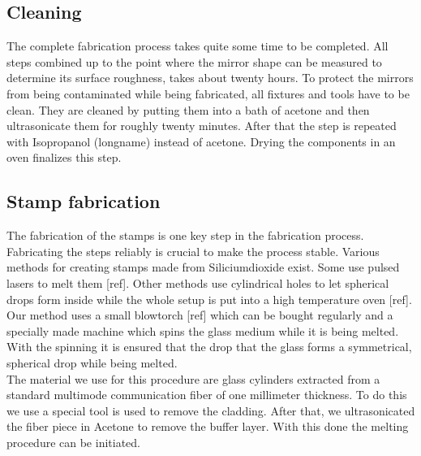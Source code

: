 \subsection{Cleaning}
The complete fabrication process takes quite some time to be completed. All steps combined up to the point where the mirror shape can be measured to determine its surface roughness, takes about twenty hours. To protect the mirrors from being contaminated while being fabricated, all fixtures and tools have to be clean. They are cleaned by putting them into a bath of acetone and then ultrasonicate them for roughly twenty minutes. After that the step is repeated with Isopropanol (longname) instead of acetone. Drying the components in an oven finalizes this step.
\subsection{Stamp fabrication}\label{ChapStampFabrication}
The fabrication of the stamps is one key step in the fabrication process. Fabricating the steps reliably is crucial to make the process stable. Various methods for creating stamps made from Siliciumdioxide exist. Some use pulsed lasers to melt them [ref]. Other methods use cylindrical holes to let spherical drops form inside while the whole setup is put into a high temperature oven [ref]. Our method uses a small blowtorch [ref] which can be bought regularly and a specially made machine which spins the glass medium while it is being melted. With the spinning it is ensured that the drop that the glass forms a symmetrical, spherical drop while being melted.\\
The material we use for this procedure are glass cylinders extracted from a standard multimode communication fiber of one millimeter thickness. To do this we use a special tool is used to remove the cladding. After that, we ultrasonicated the fiber piece in Acetone to remove the buffer layer. With this done the melting procedure can be initiated.
